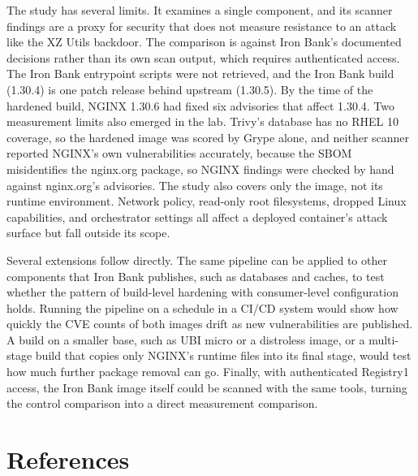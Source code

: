 \documentclass[10pt,letterpaper,twocolumn]{article}
\begin{document}
The study has several limits. It examines a single component, and its scanner findings are a proxy for security that does not measure resistance to an attack like the XZ Utils backdoor. The comparison is against Iron Bank's documented decisions rather than its own scan output, which requires authenticated access. The Iron Bank entrypoint scripts were not retrieved, and the Iron Bank build (1.30.4) is one patch release behind upstream (1.30.5). By the time of the hardened build, NGINX 1.30.6 had fixed six advisories that affect 1.30.4. Two measurement limits also emerged in the lab. Trivy's database has no RHEL 10 coverage, so the hardened image was scored by Grype alone, and neither scanner reported NGINX's own vulnerabilities accurately, because the SBOM misidentifies the nginx.org package, so NGINX findings were checked by hand against nginx.org's advisories. The study also covers only the image, not its runtime environment. Network policy, read-only root filesystems, dropped Linux capabilities, and orchestrator settings all affect a deployed container's attack surface but fall outside its scope.

Several extensions follow directly. The same pipeline can be applied to other components that Iron Bank publishes, such as databases and caches, to test whether the pattern of build-level hardening with consumer-level configuration holds. Running the pipeline on a schedule in a CI/CD system would show how quickly the CVE counts of both images drift as new vulnerabilities are published. A build on a smaller base, such as UBI micro or a distroless image, or a multi-stage build that copies only NGINX's runtime files into its final stage, would test how much further package removal can go. Finally, with authenticated Registry1 access, the Iron Bank image itself could be scanned with the same tools, turning the control comparison into a direct measurement comparison.

\section*{References}
\end{document}
